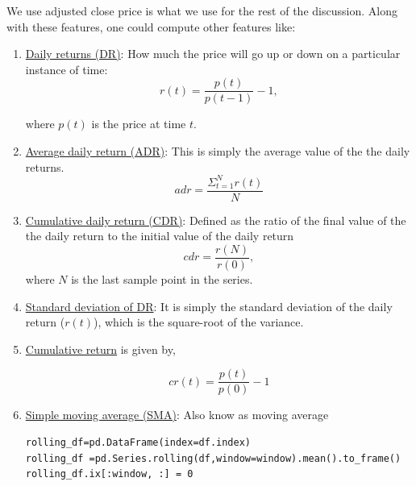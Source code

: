 \documentclass[12pt]{article}
\begin{document}
\begin{itemize}
We use adjusted close price is what we use for the rest of the discussion. Along with these features, one could compute other features like:

\begin{enumerate}
 \item \underline{Daily returns (DR)}: How much the price will go up or down on a particular instance of time:
 \begin{equation}
 \label{eq:dr}
r(t)=\frac{p(t)}{p(t-1)}-1,
\end{equation}

where $p(t)$ is the price at time $t$.

\item \underline{Average daily return (ADR)}: This is simply the average value of the the daily returns.
\begin{equation}
 \label{eq:adr}
  adr = \frac{\Sigma_{t=1}^{N} r(t)}{N}
\end{equation}

\item \underline {Cumulative daily return (CDR)}: Defined as the ratio of the final value of the the daily return to the initial value of the daily return 
\begin{equation}
 \label{eq:cdr}
cdr= \frac{r(N)}{r(0)},
\end{equation} 
where $N$ is the last sample point in the series.

\item \underline {Standard deviation of DR}: It is simply the standard deviation of the daily return ($r(t)$), which is the square-root of the variance.

\item\underline{Cumulative return} is given by,

\begin{equation}
 \label{eq:cr}
 cr(t)=\frac{p(t)}{p(0)}-1
\end{equation}

\item \underline{Simple moving average (SMA)}: Also know as moving average
  {\small \begin{verbatim}
rolling_df=pd.DataFrame(index=df.index)
rolling_df =pd.Series.rolling(df,window=window).mean().to_frame() 
rolling_df.ix[:window, :] = 0
 \end{verbatim}
}


\end{enumerate}
\end{itemize}
\end{document}
